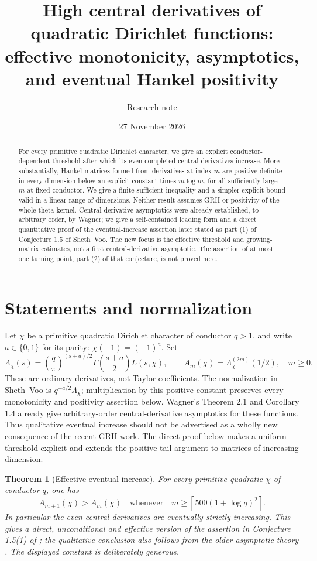\documentclass[11pt]{article}
\title{High central derivatives of quadratic Dirichlet functions:\\effective monotonicity, asymptotics, and eventual Hankel positivity}
\author{Research note}
\date{27 November 2026}
\newtheorem{theorem}{Theorem}
\begin{document}
\maketitle
\begin{abstract}
For every primitive quadratic Dirichlet character, we give an explicit conductor-dependent threshold after which its even completed central derivatives increase. More substantially, Hankel matrices formed from derivatives at index $m$ are positive definite in every dimension below an explicit constant times $m\log m$, for all sufficiently large $m$ at fixed conductor. We give a finite sufficient inequality and a simpler explicit bound valid in a linear range of dimensions. Neither result assumes GRH or positivity of the whole theta kernel. Central-derivative asymptotics were already established, to arbitrary order, by Wagner; we give a self-contained leading form and a direct quantitative proof of the eventual-increase assertion later stated as part (1) of Conjecture 1.5 of Sheth--Voo. The new focus is the effective threshold and growing-matrix estimates, not a first central-derivative asymptotic. The assertion of at most one turning point, part (2) of that conjecture, is not proved here.
\end{abstract}

\section{Statements and normalization}
Let $\chi$ be a primitive quadratic Dirichlet character of conductor $q>1$, and write $a\in\{0,1\}$ for its parity: $\chi(-1)=(-1)^a$. Set
\[
 \Lambda_\chi(s)=\left(\frac q\pi\right)^{(s+a)/2}
 \Gamma\!\left(\frac{s+a}{2}\right)L(s,\chi),\qquad
 A_m(\chi)=\Lambda_\chi^{(2m)}(1/2),\quad m\ge0.
\]
These are ordinary derivatives, not Taylor coefficients. The normalization in Sheth--Voo \cite{SV} is $q^{-a/2}\Lambda_\chi$; multiplication by this positive constant preserves every monotonicity and positivity assertion below. Wagner's Theorem 2.1 and Corollary 1.4 \cite{Wagner} already give arbitrary-order central-derivative asymptotics for these functions. Thus qualitative eventual increase should not be advertised as a wholly new consequence of the recent GRH work. The direct proof below makes a uniform threshold explicit and extends the positive-tail argument to matrices of increasing dimension.

\begin{theorem}[Effective eventual increase]\label{thm:increase}
For every primitive quadratic $\chi$ of conductor $q$, one has
\[
 A_{m+1}(\chi)>A_m(\chi)
 \quad\text{whenever}\quad
 m\ge\left\lceil500(1+\log q)^2\right\rceil.
\]
In particular the even central derivatives are eventually strictly increasing. This gives a direct, unconditional and effective version of the assertion in Conjecture 1.5(1) of \cite{SV}; the qualitative conclusion also follows from the older asymptotic theory \cite{Wagner}. The displayed constant is deliberately generous.
\end{theorem}
\end{document}
